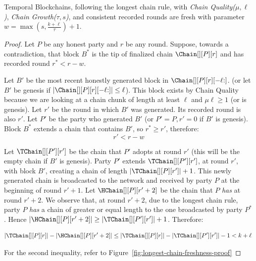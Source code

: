 \begin{theorem}
  Temporal Blockchains, following the longest chain rule,
  with \emph{Chain Quality($\mu,\ell$)},
  \emph{Chain Growth($\tau, s$)},
  and consistent recorded rounds
  are fresh with parameter $w =\max(s, \frac{k + \ell}{\tau}) + 1$.
\end{theorem}
\begin{proof}
  Let $P$ be any honest party and $r$ be any round.
  Suppose, towards a contradiction, that block $B^*$
  is the tip of finalized chain $\Chain[][P][r]$ and has
  recorded round $r^* < r - w$.

  Let $B'$ be the most recent honestly generated block
  in $\Chain[][P][r][{-\ell}{:}]$.
  (or let $B'$ be genesis if $|\Chain[][P][r][{-\ell}{:}]| \leq \ell$).
  This block exists by
  Chain Quality because we are looking at a chain chunk of length at least $\ell$ and
  $\mu\ell \geq 1$ (or is genesis).
  Let $r'$ be the round in which $B'$ was generated.
  Its recorded round is also $r'$.
  Let $P'$ be the party who generated $B'$
  (or $P' = P, r' = 0$ if $B'$ is genesis).
  Block $B^*$ extends a chain that contains $B'$, so $r^* \geq r'$,
  therefore:
  \begin{equation}
    r' < r - w \label{eq:bitcoin-r-bound}
  \end{equation}

  Let $\TChain[][P'][r']$ be the chain that $P'$ adopts at
  round $r'$ (this will be the empty chain if $B'$ is genesis).
  Party $P'$ extends $\TChain[][P'][r']$, at round $r'$, with block $B'$,
  creating a chain of length $|\TChain[][P][r']| + 1$.
  This newly generated chain is broadcasted to the network and
  received by party $P$ at the beginning of round $r' + 1$.
  Let $\HChain[][P][r' + 2]$ be the chain
  that $P$ \emph{has} at round $r' + 2$.
  We observe that, at round $r' + 2$, due to the
  longest chain rule, party $P$ \emph{has} a chain of greater or equal
  length to the one broadcasted by party $P^*$. Hence
  $|\HChain[][P][r' + 2]| \geq |\TChain[][P'][r']| + 1$. Therefore:

  \begin{equation}
    |\TChain[][P][r]| - |\HChain[][P][r' + 2]| \leq
     |\TChain[][P][r]| - |\TChain[][P'][r']| - 1 <
     k + \ell\, \label{eq:bitcoin-contradiction}
  \end{equation}

  For the second inequality, refer to Figure~\ref{fig:longest-chain-freshness-proof}


\end{proof}
